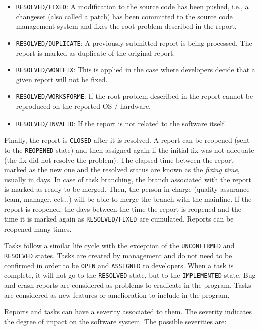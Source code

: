 \begin{itemize}
	\item {\tt RESOLVED/FIXED}: A modification to the source code has been pushed, i.e., a changeset (also called a patch) has been committed to the source code management system and fixes the root problem described in the report.
	\item {\tt RESOLVED/DUPLICATE}: A previously submitted report is being processed. The report is marked as duplicate of the original report.
	\item {\tt RESOLVED/WONTFIX}: This is applied in the case where developers decide that a given report will not be fixed.
	\item {\tt RESOLVED/WORKSFORME}: If the root problem described in the report cannot be reproduced on the reported OS / hardware.
	\item {\tt RESOLVED/INVALID}: If the report is not related to the software itself.
\end{itemize}

Finally, the report is {\tt CLOSED} after it is resolved.
A report can be reopened (sent to the {\tt REOPENED} state) and then assigned again if the initial fix was not adequate (the fix did not resolve the problem).
The elapsed time between the report marked as the new one and the resolved status are known as the {\it fixing time}, usually in days.
In case of task branching, the branch associated with the report is marked as ready to be merged.
Then, the person in charge (quality assurance team, manager, ect...) will be able to merge the branch with the mainline.
If the report is reopened: the days between the time the report is reopened and the time it is marked again as {\tt RESOLVED/FIXED} are cumulated.
Reports can be reopened many times.

Tasks follow a similar life cycle with the exception of the {\tt UNCONFIRMED} and {\tt RESOLVED} states.
Tasks are created by management and do not need to be confirmed in order to be {\tt OPEN} and {\tt ASSIGNED} to developers.
When a task is complete, it will not go to the {\tt RESOLVED} state, but to the {\tt IMPLEMENTED} state.
Bug and crash reports are considered as problems to eradicate in the program.
Tasks are considered as new features or amelioration to include in the program.

Reports and tasks can have a severity associated to them\cite{Bettenburg2008}.
The severity indicates the degree of impact on the software system.
The possible severities are:

